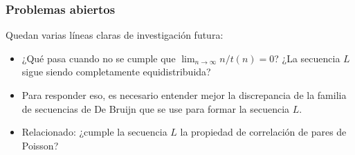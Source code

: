 \documentclass[t, 10pt, mathserif]{beamer}
\begin{document}
\begin{frame}
  \frametitle{Problemas abiertos}

  Quedan varias líneas claras de investigación futura:
  \pause

  \begin{itemize}
    \item ¿Qué pasa cuando no se cumple que $\lim_{n \to \infty} n / t(n) = 0$? ¿La secuencia $L$ sigue siendo completamente equidistribuida?
    \pause
    
    \item Para responder eso, es necesario entender mejor la discrepancia de la familia de secuencias de De Bruijn que se use para formar la secuencia $L$.
    \pause

    \item Relacionado: ¿cumple la secuencia $L$ la propiedad de correlación de pares de Poisson?
  \end{itemize}
\end{frame}

\setcounter{finalframe}{\value{framenumber}}









\end{document}
